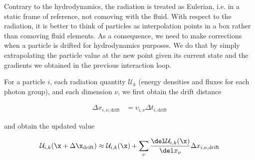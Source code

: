 Contrary to the hydrodynamics, the radiation is treated as Eulerian, i.e. in a static frame of reference, not comoving with the fluid. With respect to the radiation, it is better to think of particles as interpolation points in a box rather than comoving fluid elements. As a consequence, we need to make corrections when a particle is drifted for hydrodynamics purposes. We do that by simply extrapolating the particle value at the new point given its current state and the gradients we obtained in the previous interaction loop.

For a particle $i$, each radiation quantity $\mathcal{U}_k$ (energy densities and fluxes for each photon group), and each dimension $\nu$, we first obtain the drift distance

\begin{align}
\Delta x_{i,\nu,\text{drift}} &= v_{i,\nu} \Delta t_{i,\text{drift}}
\end{align}

and obtain the updated value

\begin{align}
\mathcal{U}_{i,k} (\x + \Delta \x_{\text{drift}}) \approx \mathcal{U}_{i,k} (\x) + \sum_\nu \frac{\del \mathcal{U}_{i,k}(\x)}{\del x_\nu} \Delta x_{i,\nu,\text{drift}}
\end{align}









